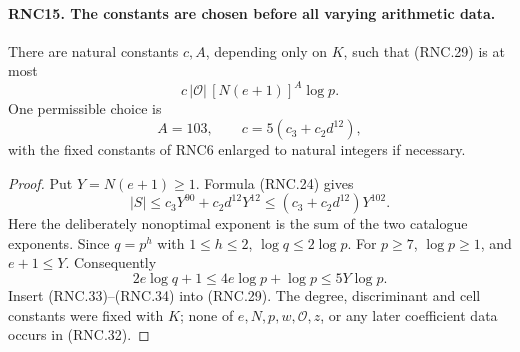 \documentclass[11pt,a4paper]{article}
\numberwithin{equation}{section}
\theoremstyle{remark}\newtheorem{remark}[theorem]{Remark}
\begin{document}
\paragraph{RNC15. The constants are chosen before all varying arithmetic data.}
\label{claim:RNC15}
There are natural constants $c,A$, depending only on $K$,
such that (RNC.29) is at most
\[
                c\,|\mathcal O|\,[N(e+1)]^A\log p.
                                                               \tag{RNC.31}
\]
One permissible choice is
\[
             A=103,\qquad c=5(c_3+c_2d^{12}),                 \tag{RNC.32}
\]
with the fixed constants of RNC6 enlarged to natural
integers if necessary.
\begin{proof}
Put $Y=N(e+1)\geq1$.  Formula (RNC.24) gives
\[
 |S|\leq c_3Y^{90}+c_2d^{12}Y^{12}
                    \leq(c_3+c_2d^{12})Y^{102}.               \tag{RNC.33}
\]
Here the deliberately nonoptimal exponent is the sum
of the two catalogue exponents.  Since $q=p^h$ with
$1\leq h\leq2$, $\log q\leq2\log p$.  For $p\geq7$,
$\log p\geq1$, and $e+1\leq Y$.  Consequently
\[
 2e\log q+1\leq4e\log p+\log p
                         \leq5Y\log p.                       \tag{RNC.34}
\]
Insert (RNC.33)--(RNC.34) into (RNC.29).  The degree,
discriminant and cell constants were fixed with $K$;
none of $e,N,p,w,\mathcal O,z$, or any later coefficient
data occurs in (RNC.32).
\end{proof}

\end{document}
